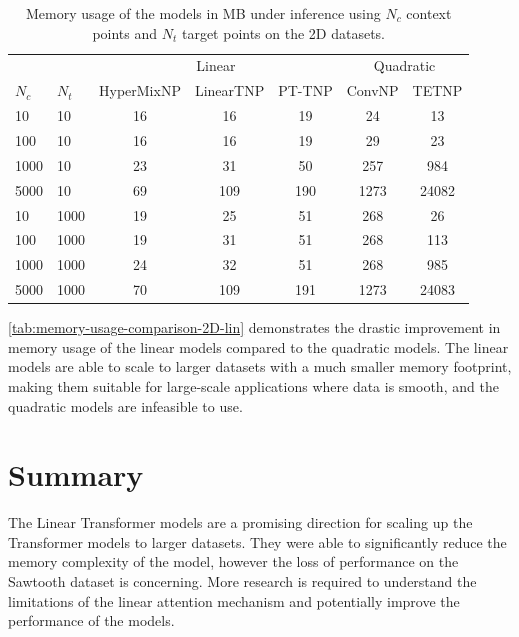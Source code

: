 \documentclass[../../main.tex]{subfiles}
\begin{document}
\begin{table}[H]
    \centering
    \begin{tabular}{@{}llccccc@{}}
    \toprule
    &  & \multicolumn{3}{c}{Linear} & \multicolumn{2}{c}{Quadratic} \\ \cmidrule(lr){3-5} \cmidrule(lr){6-7}
    $N_c$ & $N_t$  & HyperMixNP & LinearTNP & PT-TNP & ConvNP & TETNP \\ \midrule
    10     & 10    & 16         & 16        & 19     & 24     & 13    \\
    100    & 10    & 16         & 16        & 19     & 29     & 23    \\
    1000   & 10    & 23         & 31        & 50     & 257    & 984   \\
    5000   & 10    & 69         & 109       & 190    & 1273   & 24082 \\ \midrule
    10     & 1000  & 19         & 25        & 51     & 268    & 26    \\
    100    & 1000  & 19         & 31        & 51     & 268    & 113   \\
    1000   & 1000  & 24         & 32        & 51     & 268    & 985   \\
    5000   & 1000  & 70         & 109       & 191    & 1273   & 24083 \\ \bottomrule
    \end{tabular}
    \caption{Memory usage of the models in MB under inference using $N_c$ context points and $N_t$ target points on the 2D datasets.}
    \label{tab:memory-usage-comparison-2D-lin}
\end{table}
\FloatBarrier

\autoref{tab:memory-usage-comparison-2D-lin} demonstrates the drastic improvement in memory usage of the linear models compared to the quadratic models. The linear models are able to scale to larger datasets with a much smaller memory footprint, making them suitable for large-scale applications where data is smooth, and the quadratic models are infeasible to use. 

\section{Summary}

The Linear Transformer models are a promising direction for scaling up the Transformer models to larger datasets. They were able to significantly reduce the memory complexity of the model, however the loss of performance on the Sawtooth dataset is concerning. More research is required to understand the limitations of the linear attention mechanism and potentially improve the performance of the models.



\ifSubfilesClassLoaded{%
    \printbibliography{}
}{} 
\end{document}

